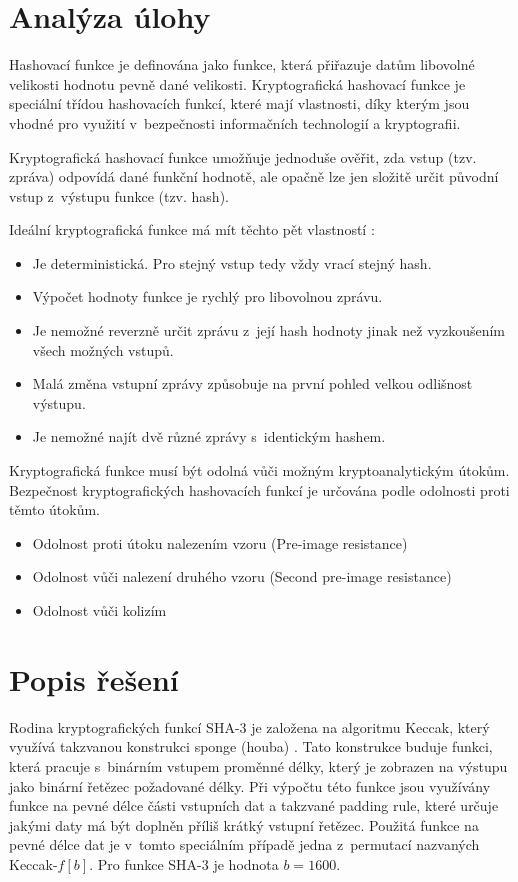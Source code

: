 \documentclass[titlepage,a4paper,12pt]{article}
\begin{document}
\section{Analýza úlohy}

Hashovací funkce je definována jako funkce, která přiřazuje datům libovolné velikosti hodnotu pevně dané velikosti. Kryptografická hashovací funkce je speciální třídou hashovacích funkcí, které mají vlastnosti, díky kterým jsou vhodné pro využití v~bezpečnosti informačních technologií a kryptografii. \par
Kryptografická hashovací funkce umožňuje jednoduše ověřit, zda vstup (tzv. zpráva) odpovídá dané funkční hodnotě, ale opačně lze jen složitě určit původní vstup z~výstupu funkce (tzv. hash). \par
Ideální kryptografická funkce má mít těchto pět vlastností \cite{wiki:cryptohash}:
\begin{itemize}
    \item Je deterministická. Pro stejný vstup tedy vždy vrací stejný hash.
    \item Výpočet hodnoty funkce je rychlý pro libovolnou zprávu.
    \item Je nemožné reverzně určit zprávu z~její hash hodnoty jinak než vyzkoušením všech možných vstupů.
    \item Malá změna vstupní zprávy způsobuje na první pohled velkou odlišnost výstupu.
    \item Je nemožné najít dvě různé zprávy s~identickým hashem.
\end{itemize}

Kryptografická funkce musí být odolná vůči možným kryptoanalytickým útokům. Bezpečnost kryptografických hashovacích funkcí je určována podle odolnosti proti těmto útokům.
\begin{itemize}
    \item Odolnost proti útoku nalezením vzoru (Pre-image resistance)
    \item Odolnost vůči nalezení druhého vzoru (Second pre-image resistance)
    \item Odolnost vůči kolizím
\end{itemize}

\section{Popis řešení}

Rodina kryptografických funkcí SHA-3 je založena na algoritmu Keccak, který využívá takzvanou konstrukci sponge (houba) \cite{keccak_structure}. Tato konstrukce buduje funkci, která pracuje s~binárním vstupem proměnné délky, který je zobrazen na výstupu jako binární řetězec požadované délky. Při výpočtu této funkce jsou využívány funkce na pevné délce části vstupních dat a takzvané padding rule, které určuje jakými daty má být doplněn příliš krátký vstupní řetězec. Použitá funkce na pevné délce dat je v~tomto speciálním případě jedna z~permutací nazvaných Keccak-\(f[b]\). Pro funkce SHA-3 je hodnota \(b = 1600\). \par
\end{document}
